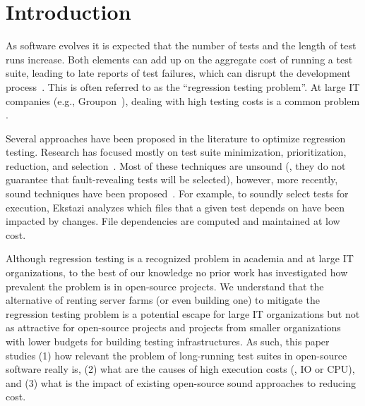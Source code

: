 \section{Introduction}

As software evolves it is expected that the number of tests and the
length of test runs increase.  Both elements can add up on the
aggregate cost of running a test suite, leading to late reports of test
failures, which can disrupt the development
process~\cite{hilton-etal-ase2016}.  This is often referred to as the
``regression testing problem''.  At large IT companies (e.g.,
Groupon~\cite{kim-etal-fse2013}), dealing with high testing costs is a
common problem .  

Several approaches have been proposed in the literature to optimize
regression testing.  Research has focused mostly on test suite
minimization, prioritization, reduction, and
selection~\cite{yoo-harman-stvr2012}.  Most of these techniques are
unsound (\ie{}, they do not guarantee that fault-revealing tests will
be selected), however, more recently, sound techniques have been
proposed~\cite{gligoric-etal-issta2015,soetens-etal-2016}.  For
example, to soundly select tests for execution,
Ekstazi\cite{ekstazi-web,gligoric-etal-issta2015} analyzes which files
that a given test depends on have been impacted by changes. File
dependencies are computed and maintained at low cost.

Although regression testing is a recognized problem in academia and at
large IT organizations, to the best of our knowledge no prior work has
investigated how prevalent the problem is in open-source projects.  We
understand that the alternative of renting server farms (or even
building one) to mitigate the regression testing problem is a
potential escape for large IT organizations but not as attractive for
open-source projects and projects from smaller organizations with
lower budgets for building testing infrastructures.  As such, this
paper studies (1) how relevant the problem of long-running test suites
in open-source software really is, (2) what are the causes of high
execution costs (\eg{}, IO or CPU), and (3) what is the impact of
existing open-source sound approaches to reducing cost.

\Fix{--------------}

